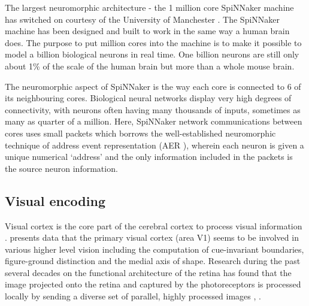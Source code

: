 \documentclass[letterpaper, 10 pt, conference]{ieeeconf}  %
\begin{document}
The largest neuromorphic architecture - the 1 million core SpiNNaker machine has switched on courtesy of the University of Manchester \cite{Furber2020}. 
The SpiNNaker machine has been designed and built to work in the same way a human brain does. 
The purpose to put million cores into the machine is to make it possible to model a billion biological neurons in real time. 
One billion neurons are still only about 1\% of the scale of the human brain but more than a whole mouse brain.

The neuromorphic aspect of SpiNNaker is the way each core is connected to 6 of its neighbouring cores. Biological neural networks display very high degrees of connectivity, with neurons often having many thousands of inputs, sometimes as many as quarter of a million. 
Here, SpiNNaker network communications between cores uses small packets which borrows the well-established neuromorphic technique of address event representation (AER \cite{Mahowald1992}), wherein each neuron is given a unique numerical ‘address’ and the only information included in the packets is the source neuron information.

\subsection{Visual encoding}

Visual cortex is the core part of the cerebral cortex to process visual information \cite{katzner2009local}.
\cite{lee1998role} presents data that the primary visual cortex (area V1) seems to be involved in various higher level vision including the computation of cue-invariant boundaries, figure-ground distinction and the medial axis of shape.
Research during the past several decades on the functional architecture of the retina has found that the image projected onto the retina and captured by the photoreceptors is processed locally by sending a diverse set of parallel, highly processed images \cite{roska2014retina}, \cite{Sanes2015}.
\end{document}
